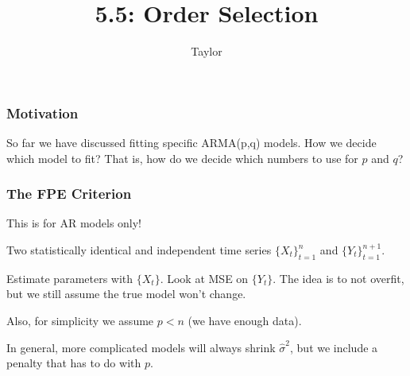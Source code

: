 \documentclass{beamer}
\title["5.5"]{5.5: Order Selection}
\author{Taylor}
\institute[UVA] 
{
University of Virginia \\
\medskip
\textit{} 
}
\date{}
\begin{document}

\begin{frame}
\titlepage 
\end{frame}

\begin{frame}
\frametitle{Motivation}

So far we have discussed fitting specific ARMA(p,q) models. How we decide which model to fit? That is, how do we decide which numbers to use for $p$ and $q$?

\end{frame}



\begin{frame}
\frametitle{The FPE Criterion}

This is for AR models only!
\newline

Two statistically identical and independent time series $\{X_t\}_{t=1}^n$ and $\{Y_t\}_{t=1}^{n+1}$.
\newline

Estimate parameters with $\{X_t\}$. Look at MSE on $\{Y_t\}$. The idea is to not overfit, but we still assume the true model won't change.
\newline

Also, for simplicity we assume $p < n$ (we have enough data).
\newline

In general, more complicated models will always shrink $\hat{\sigma}^2$, but we include a penalty that has to do with $p$.
\end{frame}

\end{document}
